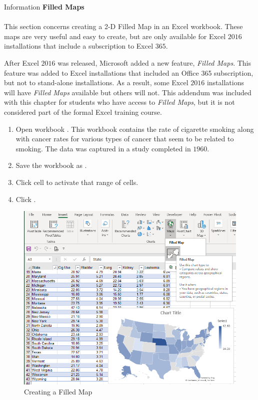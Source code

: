 \begin{center}
	\begin{infobox}{Information}
		\textbf{Filled Maps}
		\\
		\\
		This section concerns creating a 2-D Filled Map in an Excel workbook. These maps are very useful and easy to create, but are only available for Excel $ 2016 $ installations that include a subscription to Excel $ 365 $.
	\end{infobox}
\end{center}

After Excel $ 2016 $ was released, Microsoft added a new feature, \textit{Filled Maps}. This feature was added to Excel installations that included an Office 365 subscription, but not to stand-alone installations. As a result, some Excel $ 2016 $ installations will have \textit{Filled Maps} available but others will not. This addendum was included with this chapter for students who have access to \textit{Filled Maps}, but it is not considered part of the formal Excel training course.

\begin{enumerate}
	\item Open workbook . This workbook contains the rate of cigarette smoking along with cancer rates for various types of cancer that seem to be related to smoking. The data was captured in a study completed in $ 1960 $.
	\item Save the workbook as .
	\item Click cell  to activate that range of cells.
	\item Click .
\end{enumerate}

\begin{figure}[H]
	\centering
	\includegraphics[width=\maxwidth{.95\linewidth}]{gfx/ch08_fig90}
	\caption{Creating a Filled Map}
	\label{08:fig90}
\end{figure}

